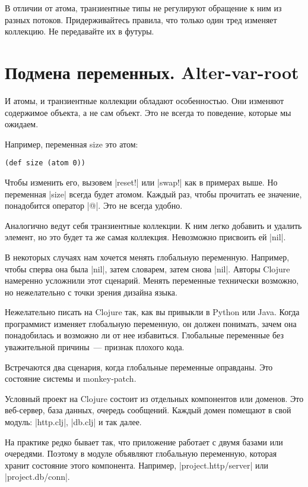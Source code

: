 В отличии от атома, транзиентные типы не регулируют обращение к ним из разных
потоков. Придерживайтесь правила, что только один тред изменяет коллекцию. Не
передавайте их в футуры.

\section{Подмена переменных. Alter-var-root}

И атомы, и транзиентные коллекции обладают особенностью. Они изменяют содержимое
объекта, а не сам объект. Это не всегда то поведение, которые мы ожидаем.

Например, переменная size это атом:

\begin{verbatim}
(def size (atom 0))
\end{verbatim}

Чтобы изменить его, вызовем \spverb|reset!| или \spverb|swap!| как в примерах выше. Но
переменная \spverb|size| всегда будет атомом. Каждый раз, чтобы прочитать ее значение,
понадобится оператор \spverb|@|. Это не всегда удобно.

Аналогично ведут себя транзиентные коллекции. К ним легко добавить и удалить
элемент, но это будет та же самая коллекция. Невозможно присвоить ей \spverb|nil|.

В некоторых случаях нам хочется менять глобальную переменную. Например, чтобы
сперва она была \spverb|nil|, затем словарем, затем снова \spverb|nil|. Авторы Clojure
намеренно усложнили этот сценарий. Менять переменные технически возможно, но
нежелательно с точки зрения дизайна языка.

Нежелательно писать на Clojure так, как вы привыкли в Python или Java. Когда
программист изменяет глобальную переменную, он должен понимать, зачем она
понадобилась и возможно ли от нее избавиться. Глобальные переменные без
уважительной причины~--- признак плохого кода.

Встречаются два сценария, когда глобальные переменные оправданы. Это состояние
системы и monkey-patch.

Условный проект на Clojure состоит из отдельных компонентов или доменов. Это
веб-сервер, база данных, очередь сообщений. Каждый домен помещают в свой модуль:
\spverb|http.clj|, \spverb|db.clj| и так далее.

На практике редко бывает так, что приложение работает с двумя базами или
очередями. Поэтому в модуле объявляют глобальную переменную, которая хранит
состояние этого компонента. Например, \spverb|project.http/server| или
\spverb|project.db/conn|.

